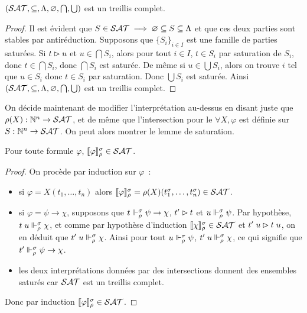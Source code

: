 \documentclass{article}
\begin{document}
\begin{lem}
  $(\mathcal {SAT},\subseteq,\Lambda,\varnothing,\bigcap,\bigcup)$ est un treillis complet.
\end{lem}

\begin{proof}
  Il est évident que $S\in \mathcal {SAT} \implies \varnothing\subseteq S \subseteq \Lambda$ et que ces deux parties sont stables par antiréduction. Supposons que $\{S_i\}_{i\in I}$ est une famille de parties saturées. Si $t\rhd u$ et $u \in \bigcap S_i$, alors pour tout $i \in I$, $t \in S_i$ par saturation de $S_i$, donc $t\in \bigcap S_i$, donc $\bigcap S_i$ est saturée. De même si $u \in \bigcup S_i$, alors on trouve $i$ tel que $u \in S_i$ donc $t\in S_i$ par saturation. Donc $\bigcup S_i$ est saturée. Ainsi $(\mathcal {SAT},\subseteq,\Lambda,\varnothing, \bigcap,\bigcup)$ est un treillis complet.
\end{proof}

On décide maintenant de modifier l'interprétation au-dessus en disant juste que $\rho(X) : \mathbb{N}^n \to \mathcal {SAT}$, et de même que l'intersection pour le $\forall X, \varphi$ est définie sur $S : \mathbb{N}^n \to \mathcal {SAT}$. On peut alors montrer le lemme de saturation.

\begin{lem}[Saturation]
  Pour toute formule $\varphi$, $\llbracket \varphi \rrbracket_\rho^\sigma\in \mathcal {SAT}$.
\end{lem}

\begin{proof}
  On procède par induction sur $\varphi$~:
  \begin{itemize}
  \item si $\varphi = X(t_1,\ldots,t_n)$ alors $\llbracket \varphi \rrbracket_\rho^\sigma=\rho(X)(t_1^\sigma,\ldots,t_n^\sigma)\in \mathcal {SAT}$.
  \item si $\varphi = \psi \to \chi$, supposons que $t\Vdash_\rho^\sigma \psi \to \chi$, $t'\rhd t$ et $u\Vdash_\rho^\sigma\psi$. Par hypothèse, $t\;u\Vdash_\rho^\sigma \chi$, et comme par hypothèse d'induction $\llbracket \chi \rrbracket_\rho^\sigma\in\mathcal {SAT}$ et $t'\;u\rhd t\;u$, on en déduit que $t'\;u\Vdash_\rho^\sigma \chi$. Ainsi pour tout $u\Vdash_\rho^\sigma\psi$, $t'\;u\Vdash_\rho^\sigma\chi$, ce qui signifie que $t'\Vdash_\rho^\sigma\psi\to\chi$.
  \item les deux interprétations données par des intersections donnent des ensembles saturés car $\mathcal {SAT}$ est un treillis complet.
  \end{itemize}
  Donc par induction $\llbracket \varphi \rrbracket_\rho^\sigma\in\mathcal {SAT}$.
\end{proof}
\end{document}
